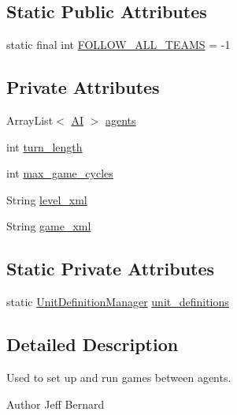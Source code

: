 \subsection*{Static Public Attributes}
\begin{DoxyCompactItemize}
\item 
static final int \hyperlink{classrts_1_1_game_a6fd172beb62474482c7739783e014614}{FOLLOW\_\-ALL\_\-TEAMS} = -\/1
\end{DoxyCompactItemize}
\subsection*{Private Attributes}
\begin{DoxyCompactItemize}
\item 
ArrayList$<$ \hyperlink{classai_1_1_a_i}{AI} $>$ \hyperlink{classrts_1_1_game_a0e71af16d4c36bddc7b2b3224c9c4bba}{agents}
\item 
int \hyperlink{classrts_1_1_game_a2a5214aaead1520fcec785be9eb47e80}{turn\_\-length}
\item 
int \hyperlink{classrts_1_1_game_a61c921b1223339a895064a209bf33aa7}{max\_\-game\_\-cycles}
\item 
String \hyperlink{classrts_1_1_game_a66bb2bee9166c825a1a9e01446dc8bce}{level\_\-xml}
\item 
String \hyperlink{classrts_1_1_game_a3db05d833106694ceb71d5abb8a4a252}{game\_\-xml}
\end{DoxyCompactItemize}
\subsection*{Static Private Attributes}
\begin{DoxyCompactItemize}
\item 
static \hyperlink{classrts_1_1units_1_1_unit_definition_manager}{UnitDefinitionManager} \hyperlink{classrts_1_1_game_ab0b00f1b077c24f37b2dff624f77d33c}{unit\_\-definitions}
\end{DoxyCompactItemize}


\subsection{Detailed Description}
Used to set up and run games between agents. 

\begin{DoxyAuthor}{Author}
Jeff Bernard 
\end{DoxyAuthor}


